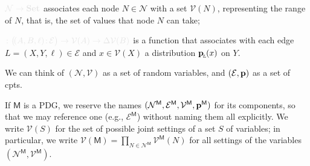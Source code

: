 \documentclass{article}
\newcommand{\notation}[2][]{#1}
\renewcommand{\notation}[2][]{{\color{notationcolor} #2}}
\newcommand{\bp}[1][L]{\mat{p}_{\!_{#1}\!}}
\newcommand{\V}{\mathcal V}
\newcommand{\N}{\mathcal N}
\newcommand{\Ed}{\mathcal E}
\newcommand{\sfM}{\mathsf M}
\newcommand{\MN}{PDG}
\numberwithin{equation}{section}
\begin{document}
\begin{defn}[\MN]
\begin{description}[nosep]
			\item[$\V$] $\notation{\N \to \mathbf{Set}}$
                          associates each node $N \in \N$ with a set
                          $\V(N)$, 
			  representing the range of $N$, that is, the
                          set of values that node $N$ can take; 
			\item[$\mat p$] $\notation{\colon \big(\!({A,B,\ell})\colon \! \Ed \big) \to \V(A) \to \Delta\V(B)}$
			is a function that associates with each edge
			 $L = (X,Y, \ell) \in \Ed$ 
 			and $x \in \V(X)$ a distribution $\bp(x)$ on $Y$. 
		\end{description}
	\end{defn}
	\begin{remark}
		We can think of $(\N, \V)$ as a set of random variables, and $(\Ed,\mat p)$ as a set of cpts.
	\end{remark}

	If $\sfM$ is a \MN, we reserve the names $\mnvars[^\sfM]$ for its components, so that we may reference one (e.g., $\Ed^\sfM$) without naming them all explicitly.
	We write $\V(S)$ for the set of possible joint settings of a set $S$
        of variables; in particular, 
	we write $\V(\sfM)
		= \prod_{N \in \N^\sfM} \V^\sfM(N)$
	 for all settings of the variables $(\N^\sfM, \V^\sfM)$.
	
\end{document}
